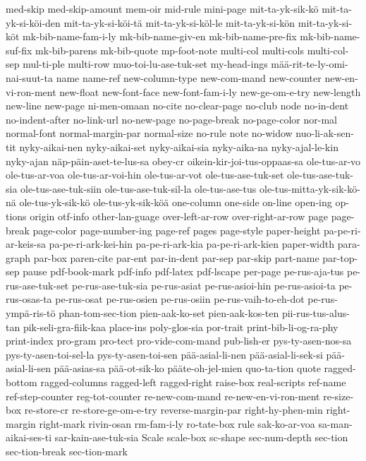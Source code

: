 {med-skip
med-skip-amount
mem-oir
mid-rule
mini-page
mit-ta-yk-sik-kö
mit-ta-yk-si-köi-den
mit-ta-yk-si-köi-tä
mit-ta-yk-si-köl-le
mit-ta-yk-si-kön
mit-ta-yk-si-köt
mk-bib-name-fam-i-ly
mk-bib-name-giv-en
mk-bib-name-pre-fix
mk-bib-name-suf-fix
mk-bib-parens
mk-bib-quote
mp-foot-note
multi-col
multi-cols
multi-col-sep
mul-ti-ple
multi-row
muo-toi-lu-ase-tuk-set
my-head-ings
mää-rit-te-ly-omi-nai-suut-ta
name
name-ref
new-column-type
new-com-mand
new-counter
new-en-vi-ron-ment
new-float
new-font-face
new-font-fam-i-ly
new-ge-om-e-try
new-length
new-line
new-page
ni-men-omaan
no-cite
no-clear-page
no-club
node
no-in-dent
no-indent-after
no-link-url
no-new-page
no-page-break
no-page-color
nor-mal
normal-font
normal-margin-par
normal-size
no-rule
note
no-widow
nuo-li-ak-sen-tit
nyky-aikai-nen
nyky-aikai-set
nyky-aikai-sia
nyky-aika-na
nyky-ajal-le-kin
nyky-ajan
näp-päin-aset-te-lus-sa
obey-cr
oikein-kir-joi-tus-oppaas-sa
ole-tus-ar-vo
ole-tus-ar-voa
ole-tus-ar-voi-hin
ole-tus-ar-vot
ole-tus-ase-tuk-set
ole-tus-ase-tuk-sia
ole-tus-ase-tuk-siin
ole-tus-ase-tuk-sil-la
ole-tus-ase-tus
ole-tus-mitta-yk-sik-kö-nä
ole-tus-yk-sik-kö
ole-tus-yk-sik-köä
one-column
one-side
on-line
open-ing
op-tions
origin
otf-info
other-lan-guage
over-left-ar-row
over-right-ar-row
page
page-break
page-color
page-number-ing
page-ref
pages
page-style
paper-height
pa-pe-ri-ar-keis-sa
pa-pe-ri-ark-kei-hin
pa-pe-ri-ark-kia
pa-pe-ri-ark-kien
paper-width
para-graph
par-box
paren-cite
par-ent
par-in-dent
par-sep
par-skip
part-name
par-top-sep
pause
pdf-book-mark
pdf-info
pdf-latex
pdf-lscape
per-page
pe-rus-aja-tus
pe-rus-ase-tuk-set
pe-rus-ase-tuk-sia
pe-rus-asiat
pe-rus-asioi-hin
pe-rus-asioi-ta
pe-rus-osas-ta
pe-rus-osat
pe-rus-osien
pe-rus-osiin
pe-rus-vaih-to-eh-dot
pe-rus-ympä-ris-tö
phan-tom-sec-tion
pien-aak-ko-set
pien-aak-kos-ten
pii-rus-tus-alus-tan
pik-seli-gra-fiik-kaa
place-ins
poly-glos-sia
por-trait
print-bib-li-og-ra-phy
print-index
pro-gram
pro-tect
pro-vide-com-mand
pub-lish-er
pys-ty-asen-nos-sa
pys-ty-asen-toi-sel-la
pys-ty-asen-toi-sen
pää-asial-li-nen
pää-asial-li-sek-si
pää-asial-li-sen
pää-asias-sa
pää-ot-sik-ko
pääte-oh-jel-mien
quo-ta-tion
quote
ragged-bottom
ragged-columns
ragged-left
ragged-right
raise-box
real-scripts
ref-name
ref-step-counter
reg-tot-counter
re-new-com-mand
re-new-en-vi-ron-ment
re-size-box
re-store-cr
re-store-ge-om-e-try
reverse-margin-par
right-hy-phen-min
right-margin
right-mark
rivin-osan
rm-fam-i-ly
ro-tate-box
rule
sak-ko-ar-voa
sa-man-aikai-ses-ti
sar-kain-ase-tuk-sia
Scale
scale-box
sc-shape
sec-num-depth
sec-tion
sec-tion-break
sec-tion-mark
}
